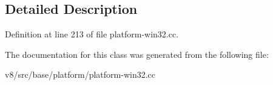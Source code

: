 \subsection{Detailed Description}


Definition at line 213 of file platform-\/win32.\+cc.



The documentation for this class was generated from the following file\+:\begin{DoxyCompactItemize}
\item 
v8/src/base/platform/platform-\/win32.\+cc\end{DoxyCompactItemize}
